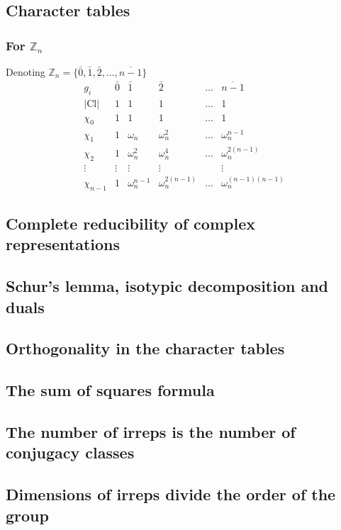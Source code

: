 \subsection{Character tables}
\subsubsection{For $\mathbb{Z}_n$}
Denoting $\mathbb{Z}_n = \{\bar{0}, \bar{1}, \bar{2},\ldots, \overline{n-1}\}$
\[ \begin{array}{l|lllll}
g_i & \bar{0} & \bar{1} & \bar{2} & \hdots & \overline{n-1} \\
|\text{Cl}| & 1 & 1 & 1 & \hdots & 1 \\ \hline
\chi_0 & 1 & 1 & 1 & \hdots & 1 \\
\chi_1 & 1 & \omega_n & \omega^2_n & \hdots & \omega_n^{n-1} \\
\chi_2 & 1 & \omega_n^2 & \omega^4_n & \hdots & \omega_n^{2(n-1)} \\
\vdots & \vdots & \vdots & \vdots &  & \vdots \\
\chi_{n-1} & 1 & \omega_n^{n-1} & \omega_n^{2(n-1)} & \hdots & \omega_n^{(n-1)(n-1)}
\end{array} \]

\subsection{Complete reducibility of complex representations}

\subsection{Schur's lemma, isotypic decomposition and duals}
\subsection{Orthogonality in the character tables}
\subsection{The sum of squares formula}
\subsection{The number of irreps is the number of conjugacy classes}
\subsection{Dimensions of irreps divide the order of the group}